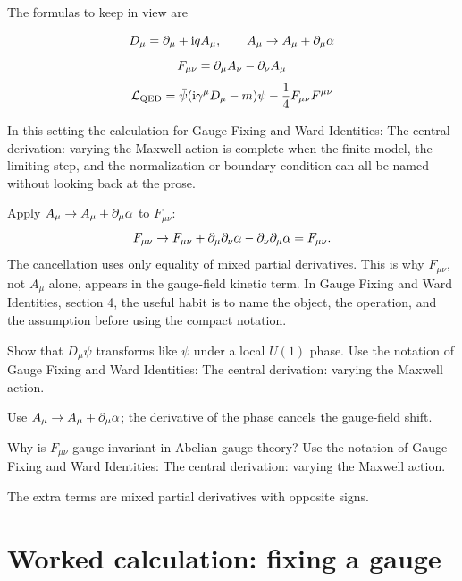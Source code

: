 The formulas to keep in view are

\[
  D_\mu=\partial_\mu+\mathrm i qA_\mu,\qquad A_\mu\to A_\mu+\partial_\mu\alpha
\]
\[
  F_{\mu\nu}=\partial_\mu A_\nu-\partial_\nu A_\mu
\]
\[
  \mathcal L_{\mathrm{QED}}=\bar\psi(\mathrm i\gamma^\mu D_\mu-m)\psi-\frac14F_{\mu\nu}F^{\mu\nu}
\]

In this setting the calculation for Gauge Fixing and Ward Identities: The central derivation: varying the Maxwell action is complete when the finite model, the limiting step, and the normalization or boundary condition can all be named without looking back at the prose.




\begin{example}
Apply \(A_\mu\to A_\mu+\partial_\mu\alpha\) to \(F_{\mu\nu}\):
\[
  F_{\mu\nu}\to F_{\mu\nu}+\partial_\mu\partial_\nu\alpha-\partial_\nu\partial_\mu\alpha=F_{\mu\nu}.
\]
The cancellation uses only equality of mixed partial derivatives.  This is why \(F_{\mu\nu}\), not \(A_\mu\) alone, appears in the gauge-field kinetic term.  In Gauge Fixing and Ward Identities, section 4, the useful habit is to name the object, the operation, and the assumption before using the compact notation.
\end{example}



\begin{exercise}
Show that \(D_\mu\psi\) transforms like \(\psi\) under a local \(U(1)\) phase.  Use the notation of Gauge Fixing and Ward Identities: The central derivation: varying the Maxwell action.
\begin{answer}
Use \(A_\mu\to A_\mu+\partial_\mu\alpha\); the derivative of the phase cancels the gauge-field shift.
\end{answer}
\end{exercise}

\begin{exercise}
Why is \(F_{\mu\nu}\) gauge invariant in Abelian gauge theory?  Use the notation of Gauge Fixing and Ward Identities: The central derivation: varying the Maxwell action.
\begin{answer}
The extra terms are mixed partial derivatives with opposite signs.
\end{answer}
\end{exercise}



\section{Worked calculation: fixing a gauge}

